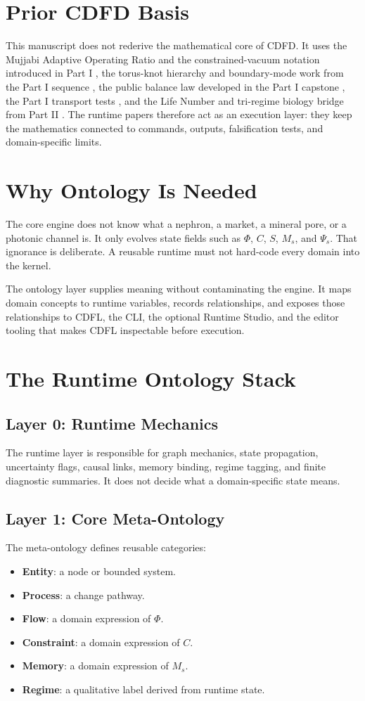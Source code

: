 \documentclass[12pt,a4paper]{article}
\begin{document}
\section{Prior CDFD Basis}
This manuscript does not rederive the mathematical core of CDFD. It uses the
Mujjabi Adaptive Operating Ratio and the constrained-vacuum notation introduced
in Part I \cite{MujjabiI2026}, the torus-knot hierarchy and boundary-mode work
from the Part I sequence \cite{MujjabiVI2026,MujjabiIX2026}, the public balance
law developed in the Part I capstone \cite{MujjabiX2026}, the Part I transport
tests \cite{MujjabiXII2026}, and the Life Number and tri-regime biology bridge
from Part II \cite{MujjabiPartII2026}. The runtime papers therefore act as an
execution layer: they keep the mathematics connected to commands, outputs,
falsification tests, and domain-specific limits.


\section{Why Ontology Is Needed}
The core engine does not know what a nephron, a market, a mineral pore, or a
photonic channel is. It only evolves state fields such as $\Phi$, $C$, $S$,
$M_s$, and $\Psi_s$. That ignorance is deliberate. A reusable runtime must not
hard-code every domain into the kernel.

The ontology layer supplies meaning without contaminating the engine. It maps
domain concepts to runtime variables, records relationships, and exposes those
relationships to CDFL, the CLI, the optional Runtime Studio, and the editor
tooling that makes CDFL inspectable before execution.

\section{The Runtime Ontology Stack}
\subsection{Layer 0: Runtime Mechanics}
The runtime layer is responsible for graph mechanics, state propagation,
uncertainty flags, causal links, memory binding, regime tagging, and finite
diagnostic summaries. It does not decide what a domain-specific state means.

\subsection{Layer 1: Core Meta-Ontology}
The meta-ontology defines reusable categories:
\begin{itemize}
    \item \textbf{Entity}: a node or bounded system.
    \item \textbf{Process}: a change pathway.
    \item \textbf{Flow}: a domain expression of $\Phi$.
    \item \textbf{Constraint}: a domain expression of $C$.
    \item \textbf{Memory}: a domain expression of $M_s$.
    \item \textbf{Regime}: a qualitative label derived from runtime state.
\end{itemize}
\end{document}
